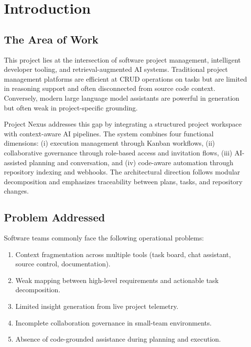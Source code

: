 \documentclass[a4paper, 11pt, oneside]{Dissertation}
\begin{document}
\pagestyle{fancy}
\tableofcontents
\listoffigures
\listoftables
\newpage

\mainmatter

\chapter{Introduction}
\label{ch:intro}

\section{The Area of Work}
This project lies at the intersection of software project management, intelligent developer tooling, and retrieval-augmented AI systems. Traditional project management platforms are efficient at CRUD operations on tasks but are limited in reasoning support and often disconnected from source code context. Conversely, modern large language model assistants are powerful in generation but often weak in project-specific grounding.

Project Nexus addresses this gap by integrating a structured project workspace with context-aware AI pipelines. The system combines four functional dimensions: (i) execution management through Kanban workflows, (ii) collaborative governance through role-based access and invitation flows, (iii) AI-assisted planning and conversation, and (iv) code-aware automation through repository indexing and webhooks. The architectural direction follows modular decomposition and emphasizes traceability between plans, tasks, and repository changes.

\section{Problem Addressed}
Software teams commonly face the following operational problems:

\begin{enumerate}
\item Context fragmentation across multiple tools (task board, chat assistant, source control, documentation).
\item Weak mapping between high-level requirements and actionable task decomposition.
\item Limited insight generation from live project telemetry.
\item Incomplete collaboration governance in small-team environments.
\item Absence of code-grounded assistance during planning and execution.
\end{enumerate}
\end{document}
